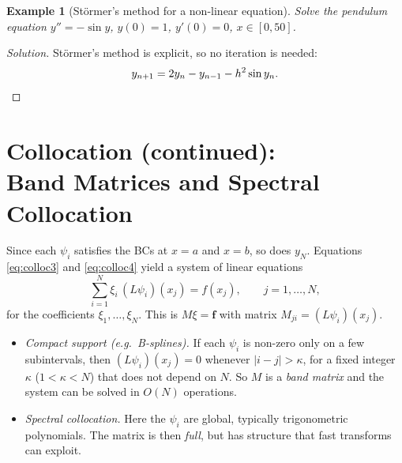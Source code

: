 \documentclass[11pt,a4paper]{article}
\numberwithin{equation}{section}
\theoremstyle{spacedplain}
\theoremstyle{spaceddefinition}
\newtheorem{example}[theorem]{Example}
\theoremstyle{spacedremark}
\begin{document}
\begin{example}[Störmer's method for a non-linear equation]
Solve the pendulum equation \(y''=-\sin y\), \(y(0)=1\), \(y'(0)=0\),
\(x\in[0,50]\).
\end{example}

\begin{proof}[Solution]
Störmer's method is explicit, so no iteration is needed:
\[
  y_{n+1}=2y_n-y_{n-1}-h^2\sin y_n .
  \qedhere
\]
\end{proof}

\section[Collocation (continued): Band Matrices and Spectral Collocation]
{Collocation (continued):\\ Band Matrices and Spectral Collocation}\label{sec:colloc2}

Since each \(\psi_i\) satisfies the BCs at \(x=a\) and \(x=b\), so does
\(y_N\).  Equations \eqref{eq:colloc3} and \eqref{eq:colloc4} yield a
system of linear equations
\[
  \sum_{i=1}^N \xi_i\,(L\psi_i)(x_j)=f(x_j),\qquad j=1,\dots,N,
\]
for the coefficients \(\xi_1,\dots,\xi_N\).  This is \(M\xi=\mathbf f\)
with matrix \(M_{ji}=(L\psi_i)(x_j)\).

\begin{itemize}
  \item \emph{Compact support (e.g.\ B-splines).}  If each \(\psi_i\)
    is non-zero only on a few subintervals, then
    \((L\psi_i)(x_j)=0\) whenever \(|i-j|>\kappa\), for a fixed integer
    \(\kappa\) (\(1<\kappa<N\)) that does not depend on \(N\).  So
    \(M\) is a \emph{band matrix} and the system can be solved in
    \(O(N)\) operations.
  \item \emph{Spectral collocation.}  Here the \(\psi_i\) are global,
    typically trigonometric polynomials.  The matrix is then
    \emph{full}, but has structure that fast transforms can exploit.
\end{itemize}
\end{document}
